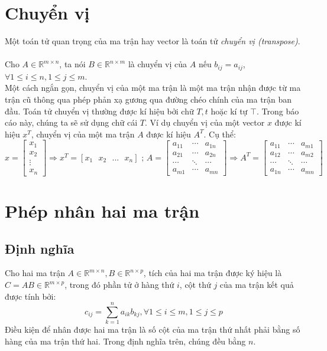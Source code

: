 \documentclass[12pt,a4paper]{report}
\begin{document}
	\section{Chuyển vị}
	Một toán tử quan trọng của ma trận hay vector là toán tử \textit{chuyển vị (transpose)}.\\\\
	Cho $A \in \mathbb{R}^{m \times n}$, ta nói $B \in \mathbb{R}^{n \times m}$ là chuyển vị của $A$ nếu $b_{ij} = a_{ij}$, $\forall 1 \leq i \leq n, 1 \leq j \leq m$.\\Một cách ngắn gọn, chuyển vị của một ma trận là một ma trận nhận được từ ma trận cũ thông qua phép phản xạ gương qua đường chéo chính của ma trận ban đầu. Toán tử chuyển vị thường được kí hiệu bởi chữ $T, t$ hoặc kí tự $\top$. Trong báo cáo này, chúng ta sẽ sử dụng chữ cái $T$. Ví dụ chuyển vị của một vector $x$ được kí hiệu $x^T$, chuyển vị của một ma trận $A$ được kí hiệu $A^T$. Cụ thể: $$x = 
	\begin{bmatrix}
		x_1\\x_2\\ \vdots\\x_n
	\end{bmatrix} \Rightarrow x^T = [x_1 \text{ } x_2 \text{ } ... \text{ } x_n] \text{ ; }  A = \begin{bmatrix}
		a_{11} &\cdots &a_{1n}\\	a_{21}&\cdots &a_{2n}\\\cdots & \ddots & \cdots\\a_{m1}&\cdots&a_{mn}
	\end{bmatrix} \Rightarrow A^T = \begin{bmatrix}
		a_{11} &\cdots &a_{m1}\\	a_{12} &\cdots &a_{m2}\\\cdots & \ddots & \cdots\\a_{1n}&\cdots&a_{mn}
	\end{bmatrix}$$
	\section{Phép nhân hai ma trận}
	\subsection{Định nghĩa}
	Cho hai ma trận $A \in \mathbb{R}^{m \times n}, B \in \mathbb{R}^{n \times p}$, tích của hai ma trận được ký hiệu là $C = AB \in \mathbb{R}^{m \times p}$, trong đó phần tử ở hàng thứ $i$, cột thứ $j$ của ma trận kết quả được tính bởi:
	\begin{equation}
		c_{ij} = \sum^{n}_{k=1} a_{ik}b_{kj}, \forall 1 \leq i \leq m, 1 \leq j \leq p
	\end{equation}
	Điều kiện để nhân được hai ma trận là số cột của ma trận thứ nhất phải bằng số hàng của ma trận thứ hai. Trong định nghĩa trên, chúng đều bằng $n$.
\end{document}
